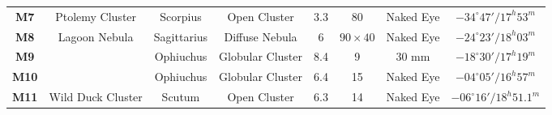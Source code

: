 \documentclass[a4paper,12pt]{extarticle}
\begin{document}
\begin{table}[H]
\begin{tabular}{cccccccc}
\textbf{M7}                              & Ptolemy Cluster                                                   & Scorpius                                      & Open Cluster                           & 3.3                                                                                           & 80                                                                                              & Naked Eye                                                                                   & $-34^\circ 47'/ 17^h 53^m$                                                                    \\
\rowcolor[HTML]{E6B8AF} 
\textbf{M8}                              & Lagoon Nebula                                                     & Sagittarius                                   & Diffuse Nebula                         & 6                                                                                             & $90 \times 40$                                                                                  & Naked Eye                                                                                   & $-24^\circ 23'/ 18^h 03^m$                                                                   \\
\rowcolor[HTML]{FFF2CC} 
\textbf{M9}                              & \multicolumn{1}{l}{\cellcolor[HTML]{FFF2CC}}                      & Ophiuchus                                     & Globular Cluster                       & 8.4                                                                                           & 9                                                                                               & 30 mm                                                                                       & $-18^\circ 30'/ 17^h 19^m$                                                                   \\
\rowcolor[HTML]{FFF2CC} 
\textbf{M10}                             & \multicolumn{1}{l}{\cellcolor[HTML]{FFF2CC}}                      & Ophiuchus                                     & Globular Cluster                       & 6.4                                                                                           & 15                                                                                              & Naked Eye                                                                                   & $-04^\circ 05'/ 16^h 57^m$                                                                   \\
\rowcolor[HTML]{D9EAD3} 
\textbf{M11}                             & Wild Duck Cluster                                                 & Scutum                                        & Open Cluster                           & 6.3                                                                                           & 14                                                                                              & Naked Eye                                                                                   & $-06^\circ 16'/ 18^h 51.1^m$                                                                 \\

\end{tabular}
\end{table}
\end{document}
